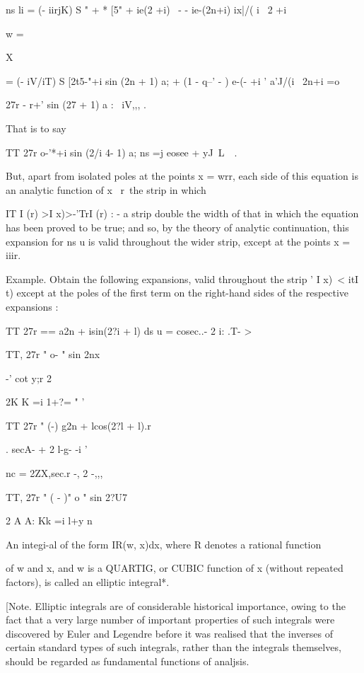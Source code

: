 ns li = (- iirjK) S " + * [5" + ie(2 +i) \ - - ie-(2n+i) ix|/( i \ 2
+i

w =

X

= (- iV/iT) S [2t5-"+i sin (2n + 1) a; + (1 - q--' - ) e-(- +i '
a'J/(i \ 2n+i =o

  27r - r+' sin (27 + 1) a : \ iV,,, .

That is to say

TT 27r o-'*+i sin (2/i 4- 1) a; ns =j eosee + yJ\ L\ \ .

But, apart from isolated poles at the points x = wrr, each side of
this equation is an analytic function of x \ r\ the strip in which

IT I (r) >I x)>-'TrI (r) : - a strip double the width of that in which
the equation has been proved to be true; and so, by the theory of
analytic continuation, this expansion for ns u is valid throughout the
wider strip, except at the points x = iiir.

%
%

Example. Obtain the following expansions, valid throughout the strip '
I x)\ < itI t) except at the poles of the first term on the right-hand
sides of the respective expansions :

TT 27r == a2n + isin(2?i + l) ds u = cosec..- 2 i: .T- >

TT, 27r " o- " sin 2nx

-' cot y;r 2

2K K =i 1+?= " '

TT 27r " (-) g2n + lcos(2?l + l).r

 . secA- + 2 l-g- -i '

nc = 2ZX,sec.r -, 2 -,,,

TT, 27r " ( - )" o " sin 2?U7

2 A A: Kk =i l+y n


An integi-al of the form IR(w, x)dx, where R denotes a rational
function

of w and x, and w is a QUARTIG, or CUBIC function of x (without
repeated factors), is called an elliptic integral*.

[Note. Elliptic integrals are of considerable historical importance,
owing to the fact that a very large number of important properties of
such integrals were discovered by Euler and Legendre before it was
realised that the inverses of certain standard types of such
integrals, rather than the integrals themselves, should be regarded as
fundamental functions of analjsis.

